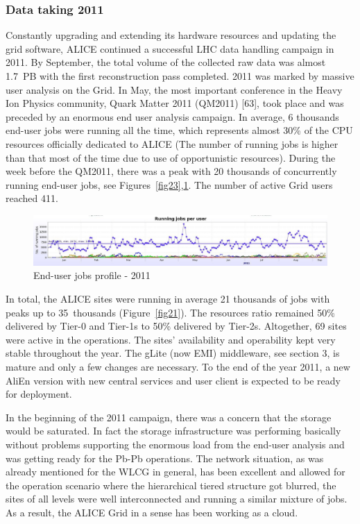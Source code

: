 \documentclass{intech}
\begin{document}
\subsubsection{Data taking 2011}
%
Constantly upgrading and extending its hardware resources and
updating the grid software, ALICE continued a successful LHC data
handling campaign in 2011. By September, the total volume of the
collected raw data was almost 1.7~PB with the first reconstruction
pass completed. 2011 was marked by massive user analysis on the
Grid. In May, the most important conference in the Heavy Ion Physics
community, Quark Matter 2011 (QM2011) [63], took place and was
preceded by an enormous end user analysis campaign. In average, 6
thousands end-user jobs were running all the time, which represents
almost 30\% of the CPU resources officially dedicated to ALICE (The
number of running jobs is higher than that most of the time due to
use of opportunistic resources). During the week before the QM2011,
there was a peak with 20 thousands of concurrently running end-user
jobs, see Figures~\ref{fig23},\ref{fig24}. The number of active Grid
users reached 411.

\begin{figure}[htb] %
\centering
\includegraphics[width=13cm]{fig24.eps} %
\caption{End-user jobs profile - 2011}\label{fig24}
\end{figure}


In total, the ALICE sites were running in average 21 thousands of
jobs with peaks up to 35~thousands (Figure~\ref{fig21}). The
resources ratio remained 50\% delivered by Tier-0 and Tier-1s to
50\% delivered by Tier-2s. Altogether, 69 sites were active in the
operations. The sites' availability and operability kept very stable
throughout the year. The gLite (now EMI) middleware, see section 3,
is mature and only a few changes are necessary. To the end of the
year 2011, a new AliEn version with new central services and user
client is expected to be ready for deployment.

In the beginning of the 2011 campaign, there was a concern that the
storage would be saturated. In fact the storage infrastructure was
performing basically without problems supporting the enormous load
from the end-user analysis and was getting ready for the Pb-Pb
operations. The network situation, as was already mentioned for the
WLCG in general, has been excellent and allowed for the operation
scenario where the hierarchical tiered structure got blurred, the
sites of all levels were well interconnected and running a similar
mixture of jobs. As a result, the ALICE Grid in a sense has been
working as a cloud.
\end{document}
